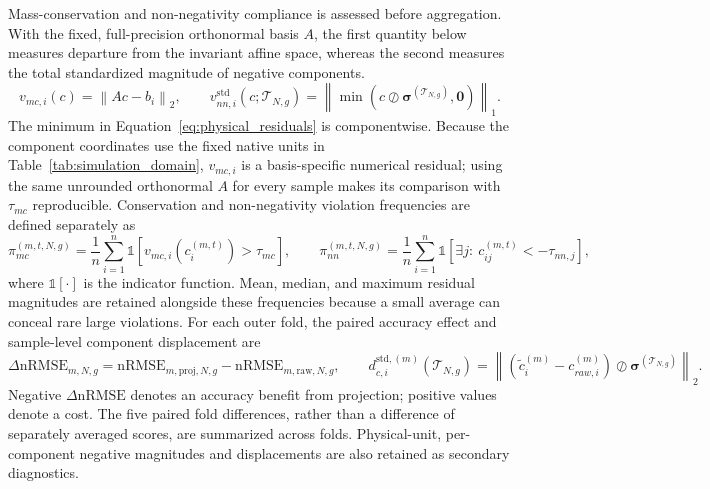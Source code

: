 \documentclass[a4paper,fleqn]{cas-sc}
\begin{document}
Mass-conservation and non-negativity compliance is assessed before aggregation. With the fixed, full-precision orthonormal basis $A$, the first quantity below measures departure from the invariant affine space, whereas the second measures the total standardized magnitude of negative components.
\begin{equation}
\label{eq:physical_residuals}
v_{mc,i}(c)=\left\|Ac-b_i\right\|_2,\qquad
v_{nn,i}^{\mathrm{std}}\!\left(c;\mathcal{T}_{N,g}\right)
=\left\|\min\!\left(c\oslash\boldsymbol{\sigma}^{(\mathcal{T}_{N,g})},
\mathbf{0}\right)\right\|_1.
\end{equation}
The minimum in Equation~\eqref{eq:physical_residuals} is componentwise. Because the component coordinates use the fixed native units in Table~\ref{tab:simulation_domain}, $v_{mc,i}$ is a basis-specific numerical residual; using the same unrounded orthonormal $A$ for every sample makes its comparison with $\tau_{mc}$ reproducible. Conservation and non-negativity violation frequencies are defined separately as
\begin{equation}
\pi_{mc}^{(m,t,N,g)}=\frac{1}{n}\sum_{i=1}^{n}
\mathbb{1}\!\left[v_{mc,i}\!\left(c_i^{(m,t)}\right)>\tau_{mc}\right],\qquad
\pi_{nn}^{(m,t,N,g)}=\frac{1}{n}\sum_{i=1}^{n}
\mathbb{1}\!\left[\exists j:\ c_{ij}^{(m,t)}<-\tau_{nn,j}\right],
\label{eq:violation_frequencies}
\end{equation}
where $\mathbb{1}[\cdot]$ is the indicator function. Mean, median, and maximum residual magnitudes are retained alongside these frequencies because a small average can conceal rare large violations. For each outer fold, the paired accuracy effect and sample-level component displacement are
\begin{equation}
\Delta\mathrm{nRMSE}_{m,N,g}
=\mathrm{nRMSE}_{m,\mathrm{proj},N,g}
-\mathrm{nRMSE}_{m,\mathrm{raw},N,g},\qquad
d_{c,i}^{\mathrm{std},(m)}\!\left(\mathcal{T}_{N,g}\right)
=\left\|\left(\tilde c_i^{(m)}-c_{raw,i}^{(m)}\right)
\oslash\boldsymbol{\sigma}^{(\mathcal{T}_{N,g})}\right\|_2.
\end{equation}
Negative $\Delta\mathrm{nRMSE}$ denotes an accuracy benefit from projection; positive values denote a cost. The five paired fold differences, rather than a difference of separately averaged scores, are summarized across folds. Physical-unit, per-component negative magnitudes and displacements are also retained as secondary diagnostics.
\end{document}
